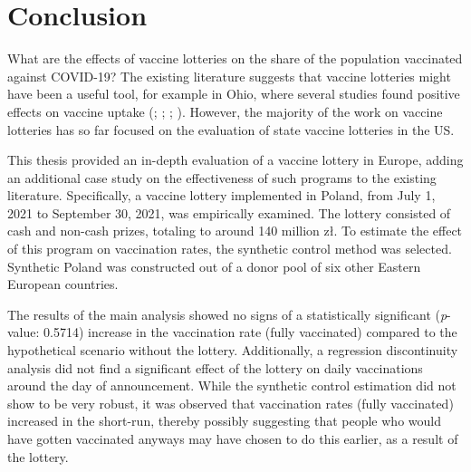 \documentclass{scrbook}
\begin{document}
\chapter{Conclusion}

What are the effects of vaccine lotteries on the share of the population
vaccinated against COVID-19? The existing literature suggests that
vaccine lotteries might have been a useful tool, for example in Ohio,
where several studies found positive effects on vaccine uptake
(\cite{mallow_covid-19_2022}; \cite{brehm_ohio_2022};
\cite{barber_conditional_2022}; \cite{sehgal_impact_2021}). However, the
majority of the work on vaccine lotteries has so far focused on the
evaluation of state vaccine lotteries in the US.

This thesis provided an in-depth evaluation of a vaccine lottery in
Europe, adding an additional case study on the effectiveness of such
programs to the existing literature. Specifically, a vaccine lottery
implemented in Poland, from July 1, 2021 to September 30, 2021, was
empirically examined. The lottery consisted of cash and non-cash prizes,
totaling to around 140 million zł. To estimate the effect of this
program on vaccination rates, the synthetic control method was selected.
Synthetic Poland was constructed out of a donor pool of six other
Eastern European countries.

The results of the main analysis showed no signs of a statistically
significant (\textit{p}-value: 0.5714) increase in the vaccination rate
(fully vaccinated) compared to the hypothetical scenario without the
lottery. Additionally, a regression discontinuity analysis did not find
a significant effect of the lottery on daily vaccinations around the day
of announcement. While the synthetic control estimation did not show to
be very robust, it was observed that vaccination rates (fully
vaccinated) increased in the short-run, thereby possibly suggesting that
people who would have gotten vaccinated anyways may have chosen to do
this earlier, as a result of the lottery.
\end{document}
